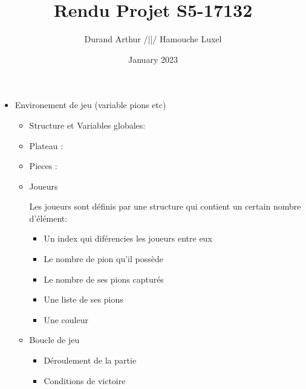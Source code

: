 \documentclass[10pt,a4paper,oneside]{report}
\title{Rendu Projet S5-17132}
\author{Durand Arthur /||/ Hamouche Luxel}
\date{January 2023}
\begin{document}


\tableofcontents
\cleardoublepage











\begin{itemize}
    \item Environement de jeu (variable pions etc)
    \begin{itemize}
        \item Structure et Variables globales:
        
        \item Plateau :



        \item Pieces :
               
        \item Joueurs

        Les joueurs sont définis par une structure qui contient un certain nombre d'élément:
        \begin{itemize}
            \item Un index qui diférencies les joueurs entre eux
            \item Le nombre de pion qu'il possède
            \item Le nombre de ses pions capturés
            \item Une liste de ses pions
            \item Une couleur
        \end{itemize}
        \item Boucle de jeu
        \begin{itemize}
            \item Déroulement de la partie 
            \item Conditions de victoire
        \end{itemize}
    \end{itemize}


\end{itemize}
\end{document}
